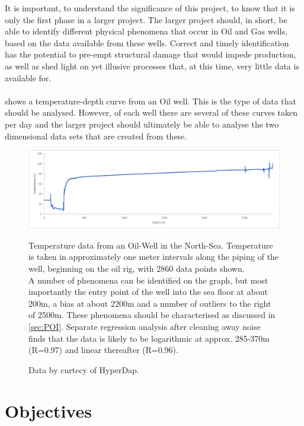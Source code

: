 \documentclass[main.tex]{subfiles}
\begin{document}
    
  It is important, to understand the significance of this project, to know that it is only the first phase in a larger project. The larger project should, in short, be able to identify different physical phenomena that occur in Oil and Gas wells, based on the data available from these wells. Correct and timely identification has the potential to pre-empt structural damage that would impede production, as well as shed light on yet illusive processes that, at this time, very little data is available for.
  \\\\
   shows a temperature-depth curve from an Oil well. This is the type of data that should be analysed. However, of each well there are several of these curves taken per day and the larger project should ultimately be able to analyse the two dimensional data sets that are created from these. 
  
  \begin{figure}[h]
    \centering
    \includegraphics[width=\linewidth]{figures/wellData}
    \caption{Temperature data from an Oil-Well in the North-Sea. Temperature is taken in approximately one meter intervals along the piping of the well, beginning on the oil rig, with 2860 data points shown. \\
    A number of phenomena can be identified on the graph, but most importantly the entry point of the well into the sea floor at about 200m, a bias at about 2200m and a number of outliers to the right of 2500m. These phenomena should be characterised as discussed in \cref{sec:POI}. Separate regression analysis after cleaning away noise finds that the data is likely to be logarithmic at approx. 285-370m (R=0.97) and linear thereafter (R=0.96).}
    \caption*{Data by curtecy of HyperDap.}
    \label{fig:well}
  \end{figure}
  
  \section{Objectives}
  
\end{document}

